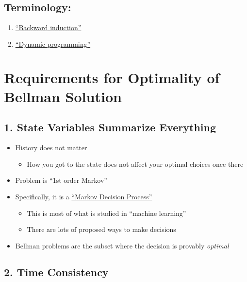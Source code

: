 \documentclass{scrartcl}
\begin{document}
\subsection*{Terminology:}\label{terminology}

\begin{enumerate}
\item \href{https://en.wikipedia.org/wiki/Backward_induction}{``Backward induction''}
\item \href{https://en.wikipedia.org/wiki/Dynamic_programming}{``Dynamic programming''}
\end{enumerate}

\label{requirements-for-bellman-solution}
\section*{Requirements for Optimality of Bellman Solution}

\label{state-variables-characterize-everything}
\subsection*{1. State Variables Summarize Everything}

\begin{itemize}
\item History does not matter

  \begin{itemize}

  \item How you got to the state does not affect your optimal choices once there
  \end{itemize}
\item Problem is ``1st order Markov''
\item Specifically, it is a \href{https://en.wikipedia.org/wiki/Markov_decision_process}{``Markov Decision Process''}

  \begin{itemize}

  \item This is most of what is studied in ``machine learning''
  \item There are lots of proposed ways to make decisions
  \end{itemize}
\item Bellman problems are the subset where the decision is provably \emph{optimal}
\end{itemize}

\label{time-consistency}
\subsection*{2. Time Consistency}
\end{document}
